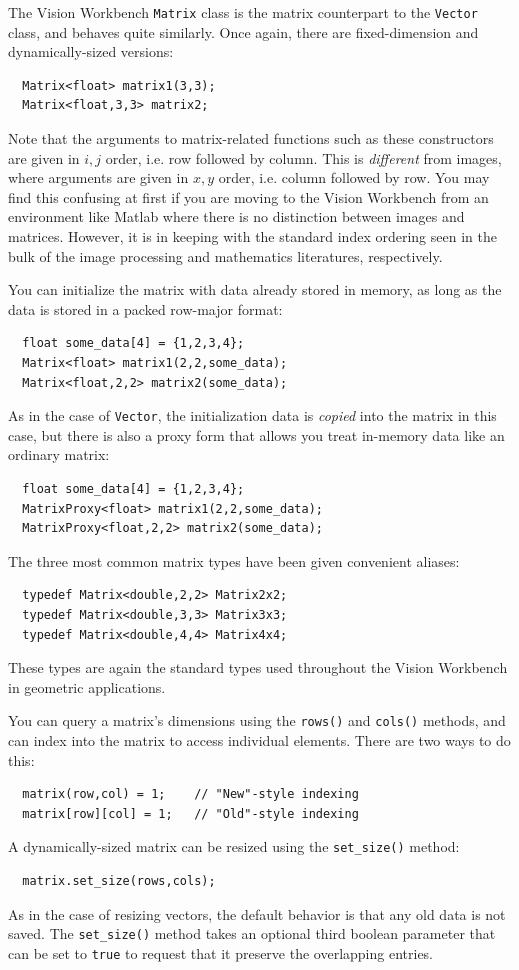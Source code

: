 The Vision Workbench \verb#Matrix# class is the matrix 
counterpart to the \verb#Vector# class, and behaves quite 
similarly.  Once again, there are fixed-dimension and 
dynamically-sized versions:
\begin{verbatim}
  Matrix<float> matrix1(3,3);
  Matrix<float,3,3> matrix2;
\end{verbatim}
Note that the arguments to matrix-related functions such 
as these constructors are given in $i,j$ order, i.e. row 
followed by column.  This is {\it different} from images, 
where arguments are given in $x,y$ order, i.e. column 
followed by row.  You may find this confusing at first if 
you are moving to the Vision Workbench from an environment 
like Matlab where there is no distinction between images 
and matrices.  However, it is in keeping with the standard 
index ordering seen in the bulk of the image processing 
and mathematics literatures, respectively.

You can initialize the matrix with data already stored 
in memory, as long as the data is stored in a packed 
row-major format:
\begin{verbatim}
  float some_data[4] = {1,2,3,4};
  Matrix<float> matrix1(2,2,some_data);
  Matrix<float,2,2> matrix2(some_data);
\end{verbatim}
As in the case of \verb#Vector#, the initialization data 
is {\it copied} into the matrix in this case, but there is 
also a proxy form that allows you treat in-memory data 
like an ordinary matrix:
\begin{verbatim}
  float some_data[4] = {1,2,3,4};
  MatrixProxy<float> matrix1(2,2,some_data);
  MatrixProxy<float,2,2> matrix2(some_data);
\end{verbatim}
The three most common matrix types have been given 
convenient aliases:
\begin{verbatim}
  typedef Matrix<double,2,2> Matrix2x2;
  typedef Matrix<double,3,3> Matrix3x3;
  typedef Matrix<double,4,4> Matrix4x4;
\end{verbatim}
These types are again the standard types used throughout the Vision 
Workbench in geometric applications.

You can query a matrix's dimensions using the \verb#rows()# and 
\verb#cols()# methods, and can index into the matrix to access 
individual elements.  There are two ways to do this:
\begin{verbatim}
  matrix(row,col) = 1;    // "New"-style indexing
  matrix[row][col] = 1;   // "Old"-style indexing
\end{verbatim}
A dynamically-sized matrix can be resized using the 
\verb#set_size()# method:
\begin{verbatim}
  matrix.set_size(rows,cols);
\end{verbatim}
As in the case of resizing vectors, the default behavior is that any
old data is not saved.  The \verb#set_size()# method takes an optional
third boolean parameter that can be set to \verb#true# to request that
it preserve the overlapping entries.

